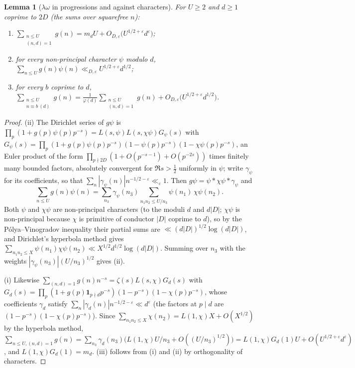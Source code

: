 \documentclass[11pt,a4paper]{article}
\newtheorem{lemma}[theorem]{Lemma}
\theoremstyle{remark}\newtheorem{remark}[theorem]{Remark}
\begin{document}
\begin{lemma}[$\lambda\omega$ in progressions and against characters]\label{lem:AP}
For $U\ge2$ and $d\ge1$ coprime to $2D$ (the sums over squarefree $n$):
\begin{enumerate}
\item[(i)] $\displaystyle\sum_{\substack{n\le U\\ (n,d)=1}}g(n)=m_dU+O_{D,\varepsilon}\bigl(U^{1/2+\varepsilon}d^{\varepsilon}\bigr)$;
\item[(ii)] for every non-principal character $\psi$ modulo $d$, $\displaystyle\sum_{n\le U}g(n)\psi(n)\ll_{D,\varepsilon}U^{1/2+\varepsilon}d^{1/2}$;
\item[(iii)] for every $b$ coprime to $d$, $\displaystyle\sum_{\substack{n\le U\\ n\equiv b\ (d)}}g(n)=\frac{1}{\varphi(d)}\sum_{\substack{n\le U\\ (n,d)=1}}g(n)+O_{D,\varepsilon}\bigl(U^{1/2+\varepsilon}d^{1/2}\bigr)$.
\end{enumerate}
\end{lemma}
\begin{proof}
(ii) The Dirichlet series of $g\psi$ is $\prod_{p}(1+g(p)\psi(p)p^{-s})=L(s,\psi)L(s,\chi\psi)G_\psi(s)$ with
$G_\psi(s)=\prod_p(1+g(p)\psi(p)p^{-s})(1-\psi(p)p^{-s})(1-\chi\psi(p)p^{-s})$, an Euler product of the form
$\prod_{p\nmid2D}(1+O(p^{-s-1})+O(p^{-2s}))$ times finitely many bounded factors, absolutely convergent for
$\Re s>\tfrac12$ uniformly in $\psi$; write $\gamma_\psi$ for
its coefficients, so that $\sum_n|\gamma_\psi(n)|n^{-1/2-\varepsilon}\ll_\varepsilon1$. Then
$g\psi=\psi*\chi\psi*\gamma_\psi$ and
\[
\sum_{n\le U}g(n)\psi(n)=\sum_{n_3}\gamma_\psi(n_3)\sum_{n_1n_2\le U/n_3}\psi(n_1)\,\chi\psi(n_2).
\]
Both $\psi$ and $\chi\psi$ are non-principal characters (to the moduli $d$ and $d|D|$; $\chi\psi$ is non-principal
because $\chi$ is primitive of conductor $|D|$ coprime to $d$), so by the P\'olya--Vinogradov inequality their partial
sums are $\ll(d|D|)^{1/2}\log(d|D|)$, and Dirichlet's hyperbola method gives
$\sum_{n_1n_2\le X}\psi(n_1)\chi\psi(n_2)\ll X^{1/2}d^{1/2}\log(d|D|)$. Summing over $n_3$ with the weights
$|\gamma_\psi(n_3)|(U/n_3)^{1/2}$ gives (ii).

(i) Likewise $\sum_{(n,d)=1}g(n)n^{-s}=\zeta(s)L(s,\chi)G_d(s)$ with $G_d(s)=\prod_p(1+g(p)\mathbf 1_{p\nmid d}p^{-s})(1-p^{-s})(1-\chi(p)p^{-s})$,
whose coefficients $\gamma_d$ satisfy $\sum_n|\gamma_d(n)|n^{-1/2-\varepsilon}\ll d^{\varepsilon}$ (the factors at $p\mid d$ are
$(1-p^{-s})(1-\chi(p)p^{-s})$). Since $\sum_{n_1n_2\le X}\chi(n_2)=L(1,\chi)X+O(X^{1/2})$ by the hyperbola method,
$\sum_{n\le U,(n,d)=1}g(n)=\sum_{n_3}\gamma_d(n_3)\bigl(L(1,\chi)U/n_3+O((U/n_3)^{1/2})\bigr)=L(1,\chi)G_d(1)U+O(U^{1/2+\varepsilon}d^\varepsilon)$,
and $L(1,\chi)G_d(1)=m_d$. (iii) follows from (i) and (ii) by orthogonality of characters.
\end{proof}
\end{document}
